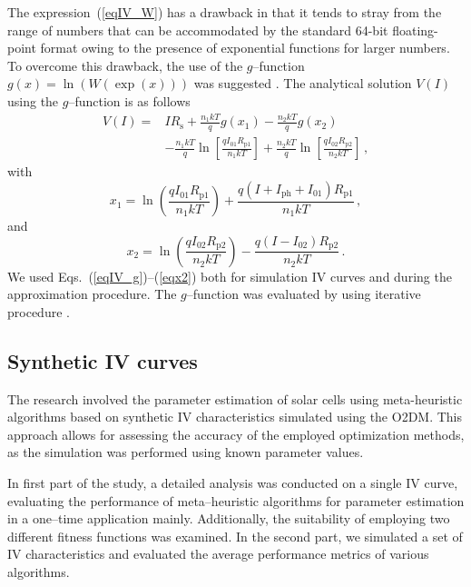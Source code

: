 \documentclass[a4paper,fleqn]{cas-dc}
\begin{document}
The expression~(\ref{eqIV_W}) has a drawback in that it tends to stray from the range of numbers that can be accommodated by the standard 64-bit floating-point format owing to the presence of exponential functions for larger numbers.
To overcome this drawback, the use of the $g$--function $g(x)=\ln(W(\exp(x)))$ was suggested \cite{roberts2015calculating}.
The analytical solution $V(I)$ using the $g$--function is as follows \cite{roberts2015calculating}
\begin{equation}
\label{eqIV_g}
\begin{split}
V(I)= &IR_\mathrm{s}+\frac{n_1kT}{q}g(x_1)-\frac{n_2kT}{q}g(x_2) \\
  &-\frac{n_1kT}{q}\ln\left[\frac{qI_{01}R_\mathrm{p1}}{n_1kT}\right] +\frac{n_2kT}{q}\ln\left[\frac{qI_{02}R_\mathrm{p2}}{n_2kT}\right]\,,
\end{split}
\end{equation}
with
\begin{equation}
\label{eqx1}
x_1= \ln\left(\frac{qI_{01}R_\mathrm{p1}}{n_1kT}\right)+\frac{q(I+I_\mathrm{ph}+I_{01})R_\mathrm{p1}}{n_1kT}\,,
\end{equation}
and
\begin{equation}
\label{eqx2}
x_2= \ln\left(\frac{qI_{02}R_\mathrm{p2}}{n_2kT}\right)-\frac{q(I-I_{02})R_\mathrm{p2}}{n_2kT}\,.
\end{equation}
We used Eqs.~(\ref{eqIV_g})--(\ref{eqx2}) both for simulation IV curves and during the approximation procedure.
The $g$--function was evaluated by using iterative procedure \cite{roberts2015calculating}.

\subsection{Synthetic IV curves}\label{SynIV}
The research involved the parameter estimation of solar cells using meta-heuristic algorithms based
on synthetic IV characteristics simulated using the O2DM.
This approach allows for assessing the accuracy of the employed optimization methods,
as the simulation was performed using known parameter values.

In first part of the study, a detailed analysis was conducted on a single IV curve,
evaluating the performance of meta--heuristic algorithms for parameter estimation in a one--time application mainly.
Additionally, the suitability of employing two different fitness functions was examined.
In the second part, we simulated a set of IV characteristics and evaluated the average performance metrics of various algorithms.
\end{document}
